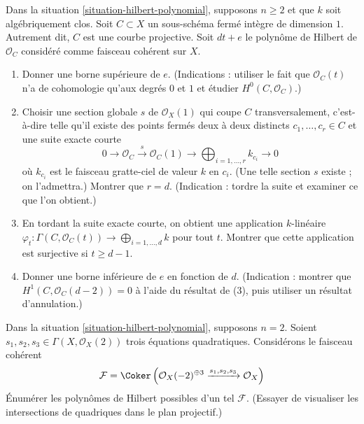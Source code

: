 \begin{exercise}
\label{exercise-bound-genus-in-degree}
Dans la situation \ref{situation-hilbert-polynomial}, supposons $n \geq 2$
et que $k$ soit algébriquement clos.
Soit $C \subset X$ un sous-schéma fermé intègre de dimension $1$.
Autrement dit, $C$ est une courbe projective.
Soit $d t + e$ le polynôme de Hilbert de $\mathcal{O}_C$
considéré comme faisceau cohérent sur $X$.
\begin{enumerate}
\item Donner une borne supérieure de $e$. (Indications : utiliser le fait que
$\mathcal{O}_C(t)$ n'a de cohomologie qu'aux degrés $0$ et $1$
et étudier $H^0(C, \mathcal{O}_C)$.)
\item Choisir une section globale $s$ de $\mathcal{O}_X(1)$
qui coupe $C$ transversalement, c'est-à-dire telle qu'il
existe des points fermés deux à deux distincts $c_1, \ldots, c_r \in C$ et
une suite exacte courte
$$
0 \to \mathcal{O}_C \xrightarrow{s} \mathcal{O}_C(1) \to
\bigoplus\nolimits_{i = 1, \ldots, r} k_{c_i} \to 0
$$
où $k_{c_i}$ est le faisceau gratte-ciel de valeur $k$ en $c_i$.
(Une telle section $s$ existe ; on l'admettra.)
Montrer que $r = d$. (Indication : tordre la suite et examiner ce que l'on obtient.)
\item En tordant la suite exacte courte, on obtient une application $k$-linéaire
$\varphi_t : \Gamma(C, \mathcal{O}_C(t)) \to \bigoplus_{i = 1, \ldots, d} k$
pour tout $t$. Montrer que cette application est surjective si $t \geq d - 1$.
\item Donner une borne inférieure de $e$ en fonction de $d$. (Indication : montrer que
$H^1(C, \mathcal{O}_C(d - 2)) = 0$ à l'aide du résultat de (3), puis utiliser
un résultat d'annulation.)
\end{enumerate}
\end{exercise}

\begin{exercise}
\label{exercise-three-quadrics-in-plane}
Dans la situation \ref{situation-hilbert-polynomial}, supposons $n = 2$.
Soient $s_1, s_2, s_3 \in \Gamma(X, \mathcal{O}_X(2))$ trois
équations quadratiques. Considérons le faisceau cohérent
$$
\mathcal{F} = \Coker\left(\mathcal{O}_X(-2)^{\oplus 3}
\xrightarrow{s_1, s_2, s_3} \mathcal{O}_X\right)
$$
Énumérer les polynômes de Hilbert possibles d'un tel $\mathcal{F}$.
(Essayer de visualiser les intersections de quadriques dans le plan projectif.)
\end{exercise}





